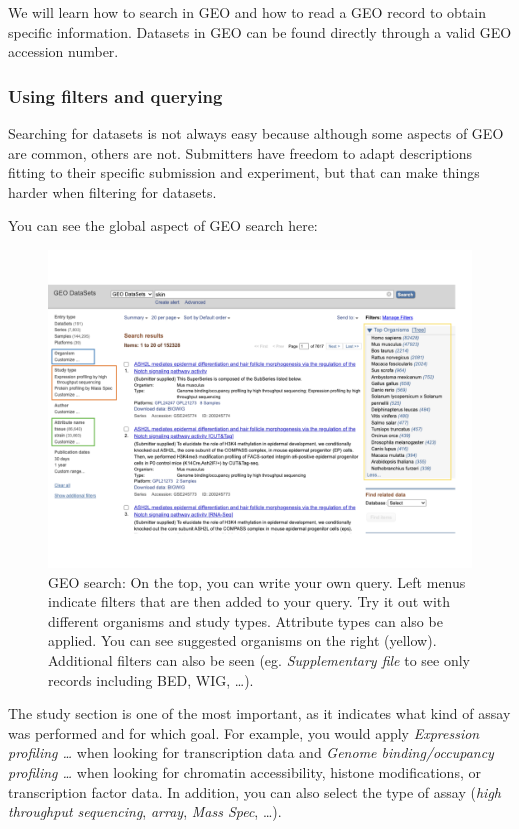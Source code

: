 \documentclass[
]{book}
\begin{document}
We will learn how to search in GEO and how to read a GEO record to obtain specific information.
Datasets in GEO can be found directly through a valid GEO accession number.

\hypertarget{using-filters-and-querying}{%
\subsubsection{Using filters and querying}\label{using-filters-and-querying}}

Searching for datasets is not always easy because although some aspects of GEO are common, others are not. Submitters have freedom to adapt descriptions fitting to their specific submission and experiment, but that can make things harder when filtering for datasets.

You can see the global aspect of GEO search here:

\begin{figure}
\centering
\includegraphics{figures/GEOfilters.png}
\caption{GEO search: On the top, you can write your own query. Left menus indicate filters that are then added to your query. Try it out with different organisms and study types. Attribute types can also be applied. You can see suggested organisms on the right (yellow). Additional filters can also be seen (eg. \emph{Supplementary file} to see only records including BED, WIG, \ldots).}
\end{figure}

The study section is one of the most important, as it indicates what kind of assay was performed and for which goal. For example, you would apply \emph{Expression profiling \ldots{}} when looking for transcription data and \emph{Genome binding/occupancy profiling \ldots{} } when looking for chromatin accessibility, histone modifications, or transcription factor data. In addition, you can also select the type of assay (\emph{high throughput sequencing}, \emph{array}, \emph{Mass Spec}, \ldots).
\end{document}
